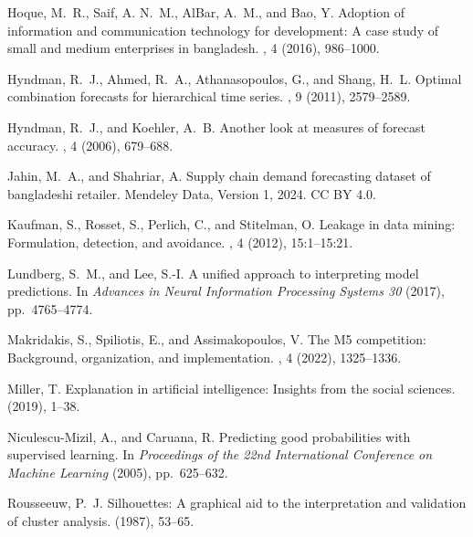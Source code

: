 \documentclass[a4paper,11pt,oneside]{book}
\theoremstyle{plain}
\theoremstyle{definition}
\theoremstyle{remark}
\renewcommand{\newblock}{\hspace{0.25em}}%
\begin{document}
\begin{thebibliography}{10}
{\sc Hoque, M.~R., Saif, A. N.~M., AlBar, A.~M., and Bao, Y.}
\newblock Adoption of information and communication technology for development:
  A case study of small and medium enterprises in bangladesh.
\newblock {\em Information Development 32}, 4 (2016), 986--1000.

{\sc Hyndman, R.~J., Ahmed, R.~A., Athanasopoulos, G., and Shang, H.~L.}
\newblock Optimal combination forecasts for hierarchical time series.
\newblock {\em Computational Statistics \& Data Analysis 55}, 9 (2011),
  2579--2589.

{\sc Hyndman, R.~J., and Koehler, A.~B.}
\newblock Another look at measures of forecast accuracy.
\newblock {\em International Journal of Forecasting 22}, 4 (2006), 679--688.

{\sc Jahin, M.~A., and Shahriar, A.}
\newblock Supply chain demand forecasting dataset of bangladeshi retailer.
\newblock Mendeley Data, Version 1, 2024.
\newblock CC BY 4.0.

{\sc Kaufman, S., Rosset, S., Perlich, C., and Stitelman, O.}
\newblock Leakage in data mining: Formulation, detection, and avoidance.
\newblock {\em ACM Transactions on Knowledge Discovery from Data 6}, 4 (2012),
  15:1--15:21.

{\sc Lundberg, S.~M., and Lee, S.-I.}
\newblock A unified approach to interpreting model predictions.
\newblock In {\em Advances in Neural Information Processing Systems 30\/}
  (2017), pp.~4765--4774.

{\sc Makridakis, S., Spiliotis, E., and Assimakopoulos, V.}
\newblock The {M5} competition: Background, organization, and implementation.
\newblock {\em International Journal of Forecasting 38}, 4 (2022), 1325--1336.

{\sc Miller, T.}
\newblock Explanation in artificial intelligence: Insights from the social
  sciences.
\newblock {\em Artificial Intelligence 267\/} (2019), 1--38.

{\sc Niculescu-Mizil, A., and Caruana, R.}
\newblock Predicting good probabilities with supervised learning.
\newblock In {\em Proceedings of the 22nd International Conference on Machine
  Learning\/} (2005), pp.~625--632.

{\sc Rousseeuw, P.~J.}
\newblock Silhouettes: A graphical aid to the interpretation and validation of
  cluster analysis.
\newblock {\em Journal of Computational and Applied Mathematics 20\/} (1987),
  53--65.


\end{thebibliography}
\end{document}
